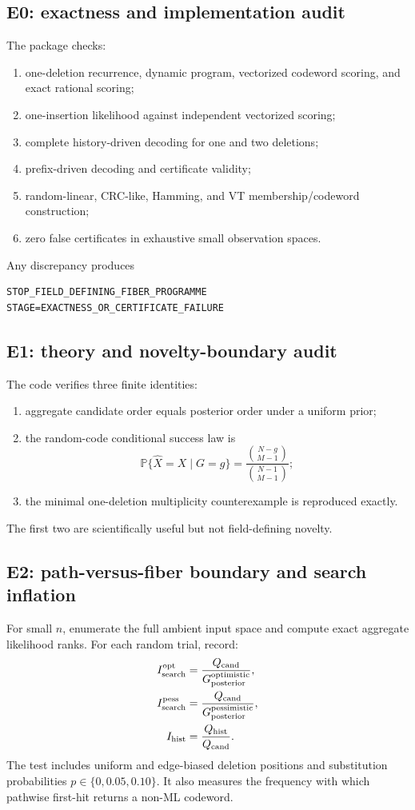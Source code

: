 \documentclass[11pt]{article}
\newcommand{\Prb}{\mathbb P}
\begin{document}
\subsection{E0: exactness and implementation audit}
The package checks:
\begin{enumerate}
\item one-deletion recurrence, dynamic program, vectorized codeword scoring, and exact rational scoring;
\item one-insertion likelihood against independent vectorized scoring;
\item complete history-driven decoding for one and two deletions;
\item prefix-driven decoding and certificate validity;
\item random-linear, CRC-like, Hamming, and VT membership/codeword construction;
\item zero false certificates in exhaustive small observation spaces.
\end{enumerate}
Any discrepancy produces
\begin{lstlisting}[basicstyle=\ttfamily\small]
STOP_FIELD_DEFINING_FIBER_PROGRAMME
STAGE=EXACTNESS_OR_CERTIFICATE_FAILURE
\end{lstlisting}

\subsection{E1: theory and novelty-boundary audit}
The code verifies three finite identities:
\begin{enumerate}
\item aggregate candidate order equals posterior order under a uniform prior;
\item the random-code conditional success law is
\begin{equation}
\Prb\{\widehat X=X\mid G=g\}
=\frac{\binom{N-g}{M-1}}{\binom{N-1}{M-1}};
\end{equation}
\item the minimal one-deletion multiplicity counterexample is reproduced exactly.
\end{enumerate}
The first two are scientifically useful but not field-defining novelty.

\subsection{E2: path-versus-fiber boundary and search inflation}
For small $n$, enumerate the full ambient input space and compute exact aggregate likelihood ranks. For each random trial, record:
\begin{align}
I_{\rm search}^{\rm opt}&=\frac{Q_{\rm cand}}{G_{\rm posterior}^{\rm optimistic}},\\
I_{\rm search}^{\rm pess}&=\frac{Q_{\rm cand}}{G_{\rm posterior}^{\rm pessimistic}},\\
I_{\rm hist}&=\frac{Q_{\rm hist}}{Q_{\rm cand}}.
\end{align}
The test includes uniform and edge-biased deletion positions and substitution probabilities $p\in\{0,0.05,0.10\}$. It also measures the frequency with which pathwise first-hit returns a non-ML codeword.
\end{document}
